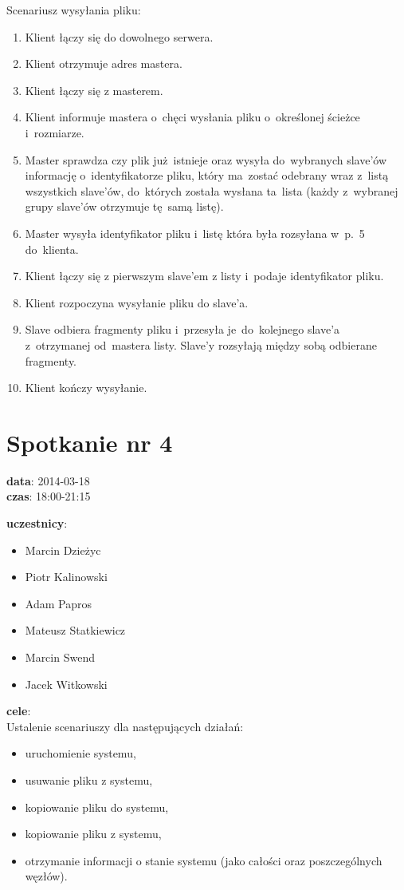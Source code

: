 \vspace{5mm}
Scenariusz wysyłania pliku:
\begin{enumerate}
	\item Klient łączy się do dowolnego serwera.
	\item Klient otrzymuje adres mastera.
	\item Klient łączy się z masterem.
	\item Klient informuje mastera o~chęci wysłania pliku o~określonej ścieżce
	i~rozmiarze.
	\item Master sprawdza czy plik już~istnieje oraz wysyła do~wybranych slave'ów
	informację o~identyfikatorze pliku, który ma~zostać odebrany wraz z~listą
	wszystkich slave'ów, do~których została wysłana ta~lista (każdy z~wybranej
	grupy slave'ów otrzymuje tę~samą listę).
	\item Master wysyła identyfikator pliku i~listę która była rozsyłana w~p.~5
	do~klienta.
	\item Klient łączy się z pierwszym slave'em z listy i~podaje identyfikator
	pliku.
	\item Klient rozpoczyna wysyłanie pliku do slave'a.
	\item Slave odbiera fragmenty pliku i~przesyła je~do~kolejnego slave'a
	z~otrzymanej od~mastera listy. Slave'y rozsyłają między sobą odbierane fragmenty.
	\item Klient kończy wysyłanie.
\end{enumerate}

\section[Spotkanie nr 4][Spotkanie nr 4]{Spotkanie nr 4}

\noindent
\textbf{data}: 2014-03-18 \\
\textbf{czas}: 18:00-21:15

\vspace{5mm}
\noindent
\textbf{uczestnicy}:
\begin{itemize}
	\item Marcin Dzieżyc
	\item Piotr Kalinowski
	\item Adam Papros
	\item Mateusz Statkiewicz
	\item Marcin Swend
	\item Jacek Witkowski
\end{itemize}

\vspace{5mm}
\noindent
\textbf{cele}: \\
Ustalenie scenariuszy dla następujących działań:
\begin{itemize}
  \item uruchomienie systemu,
  \item usuwanie pliku z systemu,
  \item kopiowanie pliku do systemu,
  \item kopiowanie pliku z systemu,
  \item otrzymanie informacji o stanie systemu (jako całości oraz poszczególnych
  węzłów).
\end{itemize}

